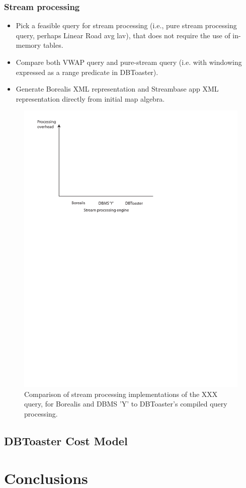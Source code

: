 \documentclass{sig-alternate}
\begin{document}
\subsubsection{Stream processing}
\begin{itemize}
\item Pick a feasible query for stream processing (i.e., pure stream processing
  query, perhaps Linear Road avg lav), that does not require the use of
  in-memory tables.
\item Compare both VWAP query and pure-stream query (i.e. with windowing
  expressed as a range predicate in DBToaster).
\item Generate Borealis XML representation and Streambase app XML representation
  directly from initial map algebra.
\end{itemize}

\begin{figure}
\includegraphics[scale=0.6]{figures/axes-streams.pdf}
\caption{Comparison of stream processing implementations of the XXX query, for
  Borealis and DBMS 'Y' to DBToaster's compiled query processing.}
\label{fig:overhead-stream}
\end{figure}

\subsection{DBToaster Cost Model}



\section{Conclusions}



\end{document}
